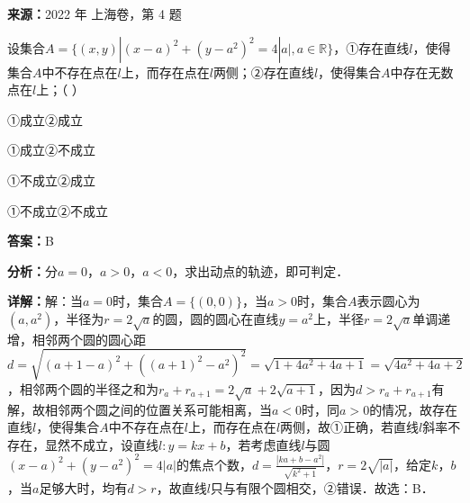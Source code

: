\begin{question}[points=5]
\textbf{来源：}2022 年 上海卷，第 4 题\par
设集合$A=\{(x,y)|(x-a)^2+(y-a^2)^2=4|a|, a\in\mathbb{R}\}$，①存在直线$l$，使得集合$A$中不存在点在$l$上，而存在点在$l$两侧；②存在直线$l$，使得集合$A$中存在无数点在$l$上；（ ）
\begin{choices}
  \item ①成立②成立
  \item ①成立②不成立
  \item ①不成立②成立
  \item ①不成立②不成立
\end{choices}
\begin{solution}
\textbf{答案：}B

\textbf{分析：}分$a=0$，$a>0$，$a<0$，求出动点的轨迹，即可判定．

\textbf{详解：}解：当$a=0$时，集合$A=\{(0,0)\}$，当$a>0$时，集合$A$表示圆心为$(a,a^2)$，半径为$r=2\sqrt{a}$的圆，圆的圆心在直线$y=a^2$上，半径$r=2\sqrt{a}$单调递增，相邻两个圆的圆心距$d=\sqrt{(a+1-a)^2+((a+1)^2-a^2)^2}=\sqrt{1+4a^2+4a+1}=\sqrt{4a^2+4a+2}$，相邻两个圆的半径之和为$r_{a}+r_{a+1}=2\sqrt{a}+2\sqrt{a+1}$，因为$d>r_{a}+r_{a+1}$有解，故相邻两个圆之间的位置关系可能相离，当$a<0$时，同$a>0$的情况，故存在直线$l$，使得集合$A$中不存在点在$l$上，而存在点在$l$两侧，故①正确，若直线$l$斜率不存在，显然不成立，设直线$l:y=kx+b$，若考虑直线$l$与圆$(x-a)^2+(y-a^2)^2=4|a|$的焦点个数，$d=\frac{|ka+b-a^2|}{\sqrt{k^2+1}}$，$r=2\sqrt{|a|}$，给定$k$，$b$，当$a$足够大时，均有$d>r$，故直线$l$只与有限个圆相交，②错误．故选：B．
\end{solution}
\end{question}

